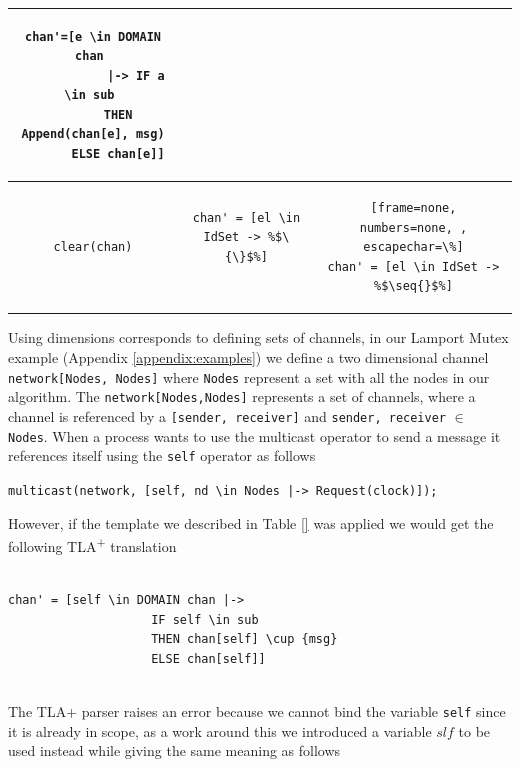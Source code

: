 \documentclass{thesul}
\newcommand{\tlaplus}{TLA\textsuperscript{+}\xspace}
\newcommand{\seq}[1]{\langle #1 \rangle}
\begin{document}
\begin{center}
\begin{tabular}{ | c | c | c | }
\begin{lstlisting}[frame=none, numbers=none]
chan'=[e \in DOMAIN chan 
			|-> IF a \in sub 
       THEN Append(chan[e], msg)
       ELSE chan[e]]

\end{lstlisting} \\ 
\hline

\begin{lstlisting}[frame=none, numbers=none]
clear(chan)
\end{lstlisting}
 & 
\begin{lstlisting}[frame=none, numbers=none, escapechar=\%]
chan' = [el \in IdSet -> %$\{\}$%]
					
\end{lstlisting} &

\begin{lstlisting}[frame=none, numbers=none, , escapechar=\%]
chan' = [el \in IdSet -> %$\seq{}$%]

\end{lstlisting} \\ 
\hline

\end{tabular}
\end{center}

Using dimensions corresponds to defining sets of channels, in our Lamport Mutex example (Appendix \ref{appendix:examples}) we define a two dimensional channel \verb|network[Nodes, Nodes]| where \verb|Nodes| represent a set with all the nodes in our algorithm. The \verb|network[Nodes,Nodes]| represents a set of channels, where a channel is referenced by a \verb|[sender, receiver]| and  \verb|sender, receiver| $\in$ \verb|Nodes|. When a process wants to use the multicast operator to send a message it references itself using the \verb|self| operator as follows  

\verb!multicast(network, [self, nd \in Nodes |-> Request(clock)]);! 

However, if the template we described in Table \ref{} was applied we would get the following \tlaplus translation

\begin{lstlisting}[frame=none, numbers=none]

chan' = [self \in DOMAIN chan |-> 
					IF self \in sub
					THEN chan[self] \cup {msg}
					ELSE chan[self]]
					
\end{lstlisting}

The TLA+ parser raises an error because we cannot bind the variable \verb|self| since it is already in scope, as a work around this we introduced a variable $slf$ to be used instead while giving the same meaning as follows
\end{document}
